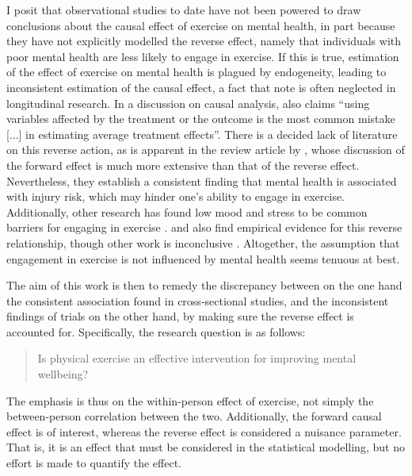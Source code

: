 I posit that observational studies to date have not been powered to draw conclusions about the causal effect
of exercise on mental health, in part because they have not explicitly modelled the reverse effect, namely that individuals with poor
mental health are less likely to engage in exercise. If this is true, estimation of the effect of exercise on mental health is
plagued by endogeneity, leading to inconsistent estimation of the causal effect, a fact that  note is often neglected in
longitudinal research. In a discussion on causal analysis,  also claims ``using variables affected by
the treatment or the outcome is the most common mistake [...] in estimating average treatment effects''.
There is a decided lack of literature on this reverse action, as is apparent in the review article by ,
whose discussion of the forward effect is much more extensive than that of the reverse effect.
Nevertheless, they establish a consistent finding that mental health is associated with injury risk, which may hinder
one's ability to engage in exercise. Additionally, other research has found low mood and stress to be common barriers for
engaging in exercise \cite{firth2016motivating}.
 and  also find empirical evidence for this reverse relationship,
though other work is inconclusive \cite{birkeland2009longitudinal, ku2012physical}. Altogether, the assumption that engagement
in exercise is not influenced by mental health seems tenuous at best.

The aim of this work is then to remedy the discrepancy between on the one hand the consistent association found in
cross-sectional studies, and the inconsistent findings of trials on the other hand, by making sure the reverse effect
is accounted for.
Specifically, the research question is as follows:
\begin{quote}
    Is physical exercise an effective intervention for improving mental wellbeing?
\end{quote}
The emphasis is thus on the within-person effect of exercise, not simply the between-person correlation between the two.
Additionally, the forward causal effect is of interest, whereas the reverse effect is considered a nuisance parameter.
That is, it is an effect that must be considered in the statistical modelling, but no effort is made to quantify
the effect.

